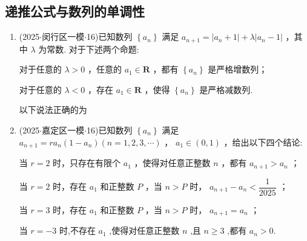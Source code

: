 \subsection*{递推公式与数列的单调性}
\begin{enumerate}
    \item (2025$\cdot$闵行区一模$\cdot$16)已知数列 $\left\{  {a}_{n}\right\}$ 满足 ${a}_{n + 1} = \left| {{a}_{n} + 1}\right|  + \lambda \left| {{a}_{n} - 1}\right|$ ，其中 $\lambda$ 为常数. 对于下述两个命题:

      对于任意的 $\lambda  > 0$ ，任意的 ${a}_{1} \in  \mathbf{R}$ ，都有 $\left\{  {a}_{n}\right\}$ 是严格增数列；

      对于任意的 $\lambda  < 0$ ，存在 ${a}_{1} \in  \mathbf{R}$ ，使得 $\left\{  {a}_{n}\right\}$ 是严格减数列.

    以下说法正确的为 

    \begin{jieda}
    \end{jieda}

    \item (2025$\cdot$嘉定区一模$\cdot$16)已知数列 $\left\{  {a}_{n}\right\}$ 满足 ${a}_{n + 1} = r{a}_{n}\left( {1 - {a}_{n}}\right) \left( {n = 1,2,3,\cdots }\right)$ ， ${a}_{1} \in  \left( {0,1}\right)$ ，给出以下四个结论:

      当 $r = 2$ 时，只存在有限个 ${a}_{1}$ ，使得对任意正整数 $n$ ，都有 ${a}_{n + 1} > {a}_{n}$ ；

      当 $r = 2$ 时，存在 ${a}_{1}$ 和正整数 $P$ ，当 $n > P$ 时， ${a}_{n + 1} - {a}_{n} < \dfrac{1}{2025}$ ；

      当 $r = 3$ 时，存在 ${a}_{1}$ 和正整数 $P$ ，当 $n > P$ 时， ${a}_{n + 1} = {a}_{n}$ ；

      当 $r =  - 3$ 时,不存在 ${a}_{1}$ ,使得对任意正整数 $n$ ,且 $n \geq  3$ ,都有 ${a}_{n} > 0$. 
    

\end{enumerate}
